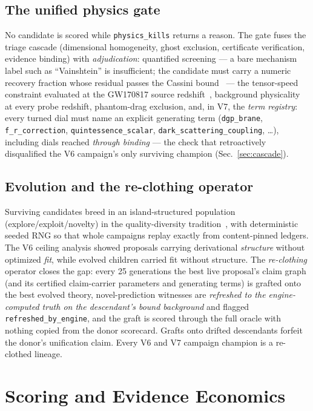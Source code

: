\documentclass[journal]{IEEEtran}
\begin{document}
\subsection{The unified physics gate}
No candidate is scored while \texttt{physics\_kills} returns a reason. The gate fuses
the triage cascade (dimensional homogeneity, ghost exclusion, certificate verification,
evidence binding) with \emph{adjudication}: quantified screening --- a bare mechanism
label such as ``Vainshtein'' is insufficient; the candidate must carry a numeric recovery
fraction whose residual passes the Cassini bound~\cite{cassini2003} --- the tensor-speed
constraint evaluated at the GW170817 source redshift~\cite{gw170817,creminelli2017},
background physicality at every probe redshift, phantom-drag exclusion, and, in V7, the
\emph{term registry}: every turned dial must name an explicit generating term
(\texttt{dgp\_brane}, \texttt{f\_r\_correction}, \texttt{quintessence\_scalar},
\texttt{dark\_scattering\_coupling}, \ldots), including dials reached \emph{through
binding} --- the check that retroactively disqualified the V6 campaign's only surviving
champion (Sec.~\ref{sec:cascade}).

\subsection{Evolution and the re-clothing operator}
Surviving candidates breed in an island-structured population (explore/exploit/novelty)
in the quality-diversity tradition~\cite{mapelites2015,noveltysearch2011}, with
deterministic seeded RNG so that whole campaigns replay exactly from content-pinned
ledgers. The V6 ceiling analysis showed proposals carrying derivational
\emph{structure} without optimized \emph{fit}, while evolved children carried fit
without structure. The \emph{re-clothing} operator closes the gap: every 25 generations
the best live proposal's claim graph (and its certified claim-carrier parameters and
generating terms) is grafted onto the best evolved theory, novel-prediction witnesses
are \emph{refreshed to the engine-computed truth on the descendant's bound background}
and flagged \texttt{refreshed\_by\_engine}, and the graft is scored through the full
oracle with nothing copied from the donor scorecard. Grafts onto drifted descendants
forfeit the donor's unification claim. Every V6 and V7 campaign champion is a
re-clothed lineage.

\section{Scoring and Evidence Economics}
\label{sec:scoring}
\end{document}
